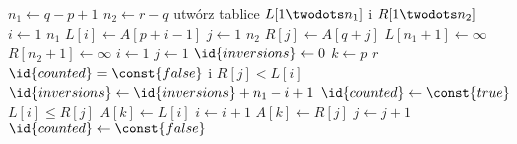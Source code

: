 \begin{codebox}
\li $n_1\gets q-p+1$
\li $n_2\gets r-q$
\li utwórz tablice $L[1\twodots n_1]$ i $R[1\twodots n_2]$
\li \For $i\gets 1$ \To $n_1$
\li     \Do
            $L[i]\gets A[p+i-1]$
        \End
\li \For $j\gets 1$ \To $n_2$
\li     \Do
            $R[j]\gets A[q+j]$
        \End
\li $L[n_1+1]\gets\infty$
\li $R[n_2+1]\gets\infty$
\li $i\gets 1$
\li $j\gets 1$
\li $\id{inversions}\gets 0$
\li \For $k\gets p$ \To $r$
\li     \Do
            \If $\id{counted}=\const{false}$ i $R[j]<L[i]$
\li             \Then
                    $\id{inversions}\gets\id{inversions}+n_1-i+1$
\li                 $\id{counted}\gets\const{true}$
                \End
\li         \If $L[i]\le R[j]$
\li             \Then
                    $A[k]\gets L[i]$
\li                 $i\gets i+1$
\li             \Else
                    $A[k]\gets R[j]$
\li                 $j\gets j+1$
\li                 $\id{counted}\gets\const{false}$
                \End
        \End
\li \Return {}
\end{codebox}
